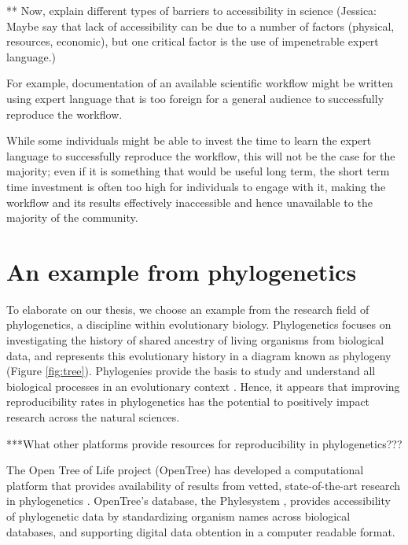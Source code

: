 \documentclass[12pt]{article}
\begin{document}
{{      ** Now, explain different types of barriers to accessibility in science
      (Jessica: Maybe say that lack of accessibility can be due to a number of
      factors (physical, resources, economic), but one critical factor is the use
      of impenetrable expert language.)

      For example, documentation of an
      available scientific workflow might be written using expert language that is too foreign
      for a general audience to successfully reproduce the workflow.

      While some individuals might
      be able to invest the time to learn the expert language to successfully reproduce
      the workflow, this will not be the case for the majority; even if it is
      something that would be useful long term, the short term time investment
      is often too high for individuals to engage with it, making the workflow and its results
      effectively inaccessible and hence unavailable to the majority of the community.
    }%
}
\bigskip

\section*{An example from phylogenetics}
\label{sec:example}

To elaborate on our thesis,
we choose an example from the research field of phylogenetics,
a discipline within evolutionary biology. Phylogenetics focuses
on investigating the history of shared ancestry of living organisms from biological data,
and represents
this evolutionary history in a diagram known as phylogeny (Figure \ref{fig:tree}).
Phylogenies provide the
basis to study and understand all biological processes in an evolutionary context
\citep{dobzhansky1973nothing}. Hence,
it appears that improving reproducibility rates
in phylogenetics has the potential to positively impact research across the natural sciences.

***What other platforms provide resources for reproducibility in phylogenetics???

The Open Tree of Life project (OpenTree) has developed a computational platform that provides
availability of results from vetted, state-of-the-art research in phylogenetics
\citep{opentreeoflife2019synth}.
OpenTree's database, the Phylesystem \citep{mctavish2015phylesystem}, provides
accessibility of phylogenetic data by standardizing organism names across biological databases,
and supporting digital data obtention in a computer readable format.
\end{document}
